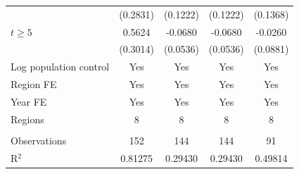 \begin{tabular}{lcccc}
                          & (0.2831)      & (0.1222)      & (0.1222)      & (0.1368)\\   
   $t \geq 5$             & 0.5624        & -0.0680       & -0.0680       & -0.0260\\   
                          & (0.3014)      & (0.0536)      & (0.0536)      & (0.0881)\\   
   Log population control & Yes           & Yes           & Yes           & Yes\\  
   Region FE              & Yes           & Yes           & Yes           & Yes\\  
   Year FE                & Yes           & Yes           & Yes           & Yes\\  
   Regions                & 8             & 8             & 8             & 8\\  
    \\
   Observations           & 152           & 144           & 144           & 91\\  
   R$^2$                  & 0.81275       & 0.29430       & 0.29430       & 0.49814\\  
   \bottomrule
\end{tabular}
\par\endgroup

